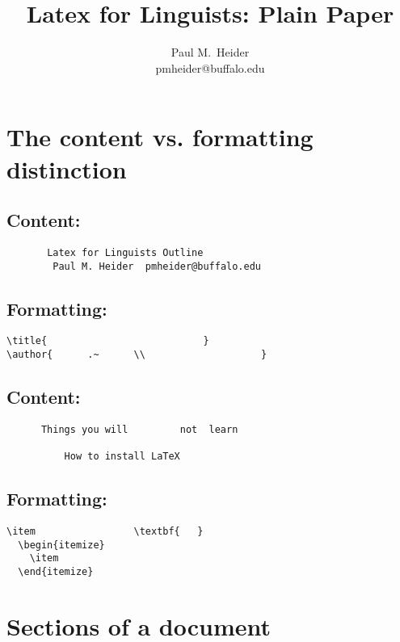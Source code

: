 \documentclass[landscape]{article}
\title{Latex for Linguists: Plain Paper}
\author{Paul M.~Heider\\pmheider@buffalo.edu}
\date{} %
\begin{document}
\begin{multicols}{2}
\maketitle
\section{The content vs. formatting distinction}

\subsection*{Content:}
\begin{verbatim}
       Latex for Linguists Outline 
        Paul M. Heider  pmheider@buffalo.edu 
\end{verbatim}

\subsection*{Formatting:}
\begin{verbatim}
\title{                           }
\author{      .~      \\                    }
\end{verbatim}

\subsection*{Content:}
\begin{verbatim}
      Things you will         not  learn

          How to install LaTeX
\end{verbatim}

\subsection*{Formatting:}
\begin{verbatim}
\item                 \textbf{   }      
  \begin{itemize}
    \item 
  \end{itemize}
\end{verbatim}

\columnbreak



\pagebreak

\section{Sections of a document}

\end{multicols}
\end{document}
